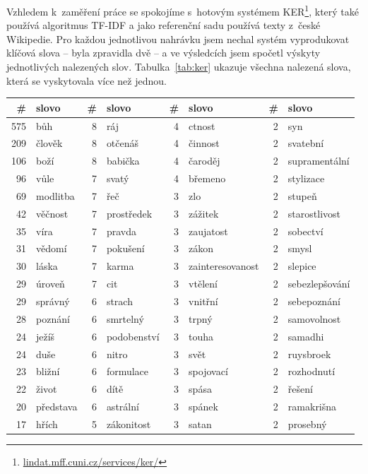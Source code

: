 Vzhledem k~zaměření práce se spokojíme s~hotovým systémem
KER\footnote{\href{http://lindat.mff.cuni.cz/services/ker/}{lindat.mff.cuni.cz/services/ker/}}, který také používá
algoritmus TF-IDF a jako referenční sadu používá texty z~české Wikipedie.
Pro každou jednotlivou nahrávku jsem nechal systém vyprodukovat klíčová slova --
byla zpravidla dvě -- a ve výsledcích jsem spočetl výskyty jednotlivých
nalezených slov.
Tabulka~\ref{tab:ker} ukazuje všechna nalezená slova, která se vyskytovala více
než jednou.

\begin{table}[htpb]
\begin{center}
\begin{tabular}{|r l|r l|r l|r l|}
\hline
\# & slovo & \# & slovo & \# & slovo & \# & slovo \\
\hline
575 & bůh	 & 8 & ráj	 & 4 & ctnost	 & 2 & syn	 \\
209 & člověk	 & 8 & otčenáš	 & 4 & činnost	 & 2 & svatební	 \\
106 & boží	 & 8 & babička	 & 4 & čaroděj	 & 2 & supramentální	 \\
96 & vůle	 & 7 & svatý	 & 4 & břemeno	 & 2 & stylizace	 \\
69 & modlitba	 & 7 & řeč	 & 3 & zlo	 & 2 & stupeň	 \\
42 & věčnost	 & 7 & prostředek	 & 3 & zážitek	 & 2 & starostlivost	 \\
35 & víra	 & 7 & pravda	 & 3 & zaujatost	 & 2 & sobectví	 \\
31 & vědomí	 & 7 & pokušení	 & 3 & zákon	 & 2 & smysl	 \\
30 & láska	 & 7 & karma	 & 3 & zainteresovanost & 2 & slepice	 \\
29 & úroveň	 & 7 & cit	 & 3 & vtělení	 & 2 & sebezlepšování	 \\
29 & správný	 & 6 & strach	 & 3 & vnitřní	 & 2 & sebepoznání	 \\
28 & poznání	 & 6 & smrtelný	 & 3 & trpný	 & 2 & samovolnost	 \\
24 & ježíš	 & 6 & podobenství	 & 3 & touha	 & 2 & samadhi	 \\
24 & duše	 & 6 & nitro	 & 3 & svět	 & 2 & ruysbroek	 \\
23 & bližní	 & 6 & formulace	 & 3 & spojovací	 & 2 & rozhodnutí	 \\
22 & život	 & 6 & dítě	 & 3 & spása	 & 2 & řešení	 \\
20 & představa	 & 6 & astrální	 & 3 & spánek	 & 2 & ramakrišna	 \\
17 & hřích	 & 5 & zákonitost	 & 3 & satan	 & 2 & prosebný	 \\

\end{tabular}
\end{center}
\end{table}
